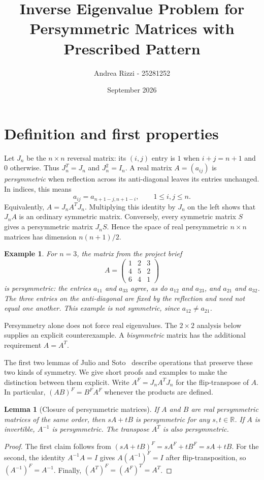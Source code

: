 \documentclass[11pt,a4paper]{article}
\title{Inverse Eigenvalue Problem for Persymmetric Matrices with Prescribed Pattern}
\author{Andrea Rizzi - 25281252}
\date{September 2026}
\newtheorem{example}{Example}
\newtheorem{lemma}{Lemma}
\begin{document}
\maketitle

\section{Definition and first properties}

Let $J_n$ be the $n\times n$ reversal matrix: its $(i,j)$ entry is $1$ when
$i+j=n+1$ and $0$ otherwise. Thus $J_n^T=J_n$ and $J_n^2=I_n$. A real matrix
$A=(a_{ij})$ is \emph{persymmetric} when reflection across its anti-diagonal
leaves its entries unchanged. In indices, this means
\begin{equation}\label{eq:persymmetry}
 a_{ij}=a_{n+1-j,n+1-i},\qquad 1\leq i,j\leq n.
\end{equation}
Equivalently, $A=J_nA^TJ_n$. Multiplying this identity by $J_n$ on the left
shows that $J_nA$ is an ordinary symmetric matrix. Conversely, every symmetric
matrix $S$ gives a persymmetric matrix $J_nS$. Hence the space of real
persymmetric $n\times n$ matrices has dimension $n(n+1)/2$.

\begin{example}
For $n=3$, the matrix from the project brief~\cite{project-brief}
\[
 A=\begin{pmatrix}1&2&3\\4&5&2\\6&4&1\end{pmatrix}
\]
is persymmetric: the entries $a_{11}$ and $a_{33}$ agree, as do $a_{12}$ and
$a_{23}$, and $a_{21}$ and $a_{32}$. The three entries on the anti-diagonal
are fixed by the reflection and need not equal one another. This example is
not symmetric, since $a_{12}\ne a_{21}$.
\end{example}

Persymmetry alone does not force real eigenvalues. The $2\times2$ analysis
below supplies an explicit counterexample. A \emph{bisymmetric} matrix has the
additional requirement $A=A^T$.

The first two lemmas of Julio and Soto~\cite{julio-soto} describe operations
that preserve these two kinds of symmetry. We give short proofs and examples
to make the distinction between them explicit. Write $A^F=J_nA^TJ_n$ for the
flip-transpose of $A$. In particular, $(AB)^F=B^FA^F$ whenever the products
are defined.

\begin{lemma}[Closure of persymmetric matrices]\label{lem:persymmetric-closure}
If $A$ and $B$ are real persymmetric matrices of the same order, then
$sA+tB$ is persymmetric for any $s,t\in\mathbb R$. If $A$ is invertible,
$A^{-1}$ is persymmetric. The transpose $A^T$ is also persymmetric.
\end{lemma}
\begin{proof}
The first claim follows from
$(sA+tB)^F=sA^F+tB^F=sA+tB$. For the second, the identity
$A^{-1}A=I$ gives $A(A^{-1})^F=I$ after flip-transposition, so
$(A^{-1})^F=A^{-1}$. Finally,
$(A^T)^F=(A^F)^T=A^T$.
\end{proof}
\end{document}
